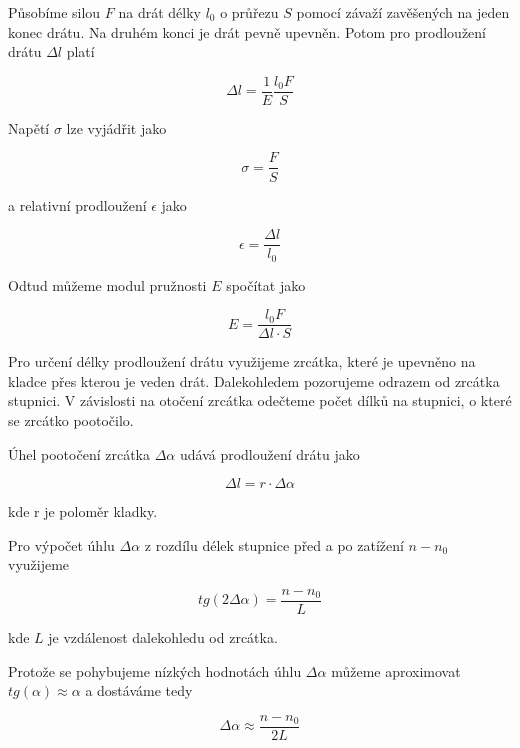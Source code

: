 Působíme silou \(F\) na drát délky \(l_0\) o průřezu \(S\) pomocí závaží zavěšených na jeden konec drátu. Na druhém konci je drát pevně upevněn. Potom pro prodloužení drátu \(\Delta l\) platí

\begin{equation}
    \Delta l = \frac{1}{E} \frac{l_0 F}{S}
\end{equation}

Napětí \(\sigma\) lze vyjádřit jako

\begin{equation}
    \sigma = \frac{F}{S}
\end{equation}

a relativní prodloužení \(\epsilon\) jako

\begin{equation}
    \epsilon = \frac{\Delta l}{l_0}
\end{equation}

Odtud můžeme modul pružnosti \(E\) spočítat jako

\begin{equation}
    E = \frac{l_0 F}{\Delta l \cdot S}
\end{equation}

Pro určení délky prodloužení drátu využijeme zrcátka, které je upevněno na kladce přes kterou je veden drát. Dalekohledem pozorujeme odrazem od zrcátka stupnici. V závislosti na otočení zrcátka odečteme počet dílků na stupnici, o které se zrcátko pootočilo.

\newpage

Úhel pootočení zrcátka \(\Delta \alpha\) udává prodloužení drátu jako

\begin{equation}
    \Delta l = r \cdot \Delta \alpha
\end{equation}

kde r je poloměr kladky.

Pro výpočet úhlu \(\Delta \alpha\) z rozdílu délek stupnice před a po zatížení \(n - n_0\) využijeme

\begin{equation}
    tg (2 \Delta \alpha) = \frac{n - n_0}{L}
\end{equation}

kde \(L\) je vzdálenost dalekohledu od zrcátka.

Protože se pohybujeme nízkých hodnotách úhlu \(\Delta \alpha\) můžeme aproximovat \(tg(\alpha) \approx \alpha\) a dostáváme tedy

\begin{equation}
    \Delta \alpha \approx \frac{n - n_0}{2L}
\end{equation}

